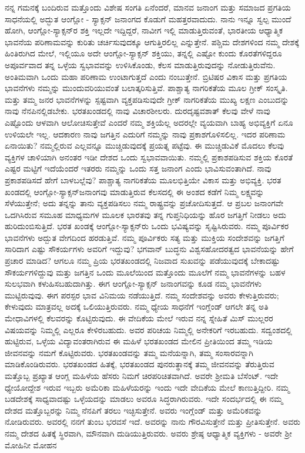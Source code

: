 ನನ್ನ ಗಮನಕ್ಕೆ ಬಂದಿರುವ ಮತ್ತೊಂದು ವಿಶೇಷ ಸಂಗತಿ ಏನೆಂದರೆ, ಮಾನವ ಜನಾಂಗ ಮತ್ತು ಸಮಾಜದ ಪ್ರಗತಿಯ ಸಾಧನೆಯಲ್ಲಿ ಅದ್ಭುತ ಆಂಗ್ಲೋ - ಸ್ಯಾಕ್ಸನ್​ ಜನಾಂಗದ ಕೊಡುಗೆ ಮಹತ್ತರವಾದುದು. ನಾನು ಇನ್ನೂ ಸ್ವಲ್ಪ ಮುಂದೆ ಹೋಗಿ, ಆಂಗ್ಲೋ-ಸ್ಯಾಕ್ಸನ್​ರ ಶಕ್ತಿ ಇಲ್ಲದೇ ಇದ್ದಿದ್ದರೆ, ನಾವೀಗ ಇಲ್ಲಿ ಮಾಡುತ್ತಿರುವಂತೆ, ಭಾರತೀಯ ಆಧ್ಯಾತ್ಮಿಕ ಭಾವನೆಯ ಪರಿಣಾಮವನ್ನು ಕುರಿತು ಚರ್ಚಿಸುವುದಕ್ಕೂ ಆಗುತ್ತಿರಲಿಲ್ಲ ಎನ್ನುತ್ತೇನೆ. ಪಶ್ಚಿಮ ದೇಶಗಳಿಂದ ನಮ್ಮ ದೇಶಕ್ಕೆ ಹಿಂತಿರುಗಿದ ಮೇಲೆ, ಇಲ್ಲಿಯೂ ಅದೇ ಆಂಗ್ಲೋ-ಸ್ಯಾಕ್ಸನ್​ ಶಕ್ತಿಯು, ತನ್ನಲ್ಲಿ ಎಷ್ಟೋ ಕುಂದು ಕೊರತೆಗಳಿದ್ದರೂ ಅಪೂರ್ವವಾದ ತನ್ನ ಒಳ್ಳೆಯ ಸ್ವಭಾವವನ್ನು ಉಳಿಸಿಕೊಂಡು, ಕೆಲಸ ಮಾಡುತ್ತಿರುವುದನ್ನು ನೋಡುತ್ತಿರುವೆನು. ಅಂತಿಮವಾಗಿ ಒಂದು ಮಹಾ ಪರಿಣಾಮ ಉಂಟಾಗುತ್ತದೆ ಎಂದು ನಂಬುತ್ತೇನೆ. ಬ್ರಿಟಿಷರ ವಿಕಾಸ ಮತ್ತು ಪ್ರಗತಿಯ ಭಾವನೆಗಳು ನಮ್ಮನ್ನು ಮುಂದುವರಿಯುವಂತೆ ಬಲಾತ್ಕರಿಸುತ್ತಿವೆ. ಪಾಶ್ಚಾತ್ಯ ನಾಗರಿಕತೆಯ ಮೂಲ ಗ್ರೀಕ್​ ಸಂಸ್ಕೃತಿ. ಮತ್ತು ತಮ್ಮ ಜನರ ಭಾವನೆಗಳನ್ನು ಸ್ಪಷ್ಟವಾಗಿ ವ್ಯಕ್ತಪಡಿಸುವುದೇ ಗ್ರೀಕ್​ ನಾಗರಿಕತೆಯ ಮುಖ್ಯ ಲಕ್ಷಣ ಎಂಬುದನ್ನು ನಾವು ನೆನಪಿನಲ್ಲಿಡಬೇಕು. ಭರತಖಂಡದಲ್ಲಿ ನಾವು ವಿಚಾರಶೀಲರು. ದುರದೃಷ್ಟವಶಾತ್​ ಕೆಲವು ವೇಳೆ ನಾವು ಎಷ್ಟೊಂದು ಆಳವಾಗಿ ಆಲೋಚಿಸುತ್ತೇವೆ ಎಂದರೆ ನಮ್ಮ ಶಕ್ತಿಯೆಲ್ಲ ಅದರಲ್ಲೇ ವ್ಯಯವಾಗಿ ಬಾಹ್ಯ ಅಭಿವ್ಯಕ್ತಿಗೆ ಏನೂ ಉಳಿಯಲೇ ಇಲ್ಲ. ಆದಕಾರಣ ನಾವು ಜಗತ್ತಿನ ಎದುರಿಗೆ ನಮ್ಮನ್ನು ನಾವು ಪ್ರಕಾಶಗೊಳಿಸಲಿಲ್ಲ. ಇದರ ಪರಿಣಾಮ ಏನಾಯಿತು? ನಮ್ಮಲ್ಲಿರುವ ಎಲ್ಲವನ್ನೂ ಮುಚ್ಚಿಡುವುದಕ್ಕೆ ಪ್ರಯತ್ನ ಪಟ್ಟೆವು. ಈ ಮುಚ್ಚಿಡುವಿಕೆ ಮೊದಲು ಕೆಲವು ವ್ಯಕ್ತಿಗಳ ಚಾಳಿಯಾಗಿ ಅನಂತರ ಇಡೀ ದೇಶದ ಒಂದು ಸ್ವಭಾವವಾಯಿತು. ನಮ್ಮಲ್ಲಿ ಪ್ರಕಾಶಪಡಿಸುವ ಶಕ್ತಿಯ ಕೊರತೆ ಎಷ್ಟರ ಮಟ್ಟಿಗೆ ಇದೆಯೆಂದರೆ ಇತರರು ನಮ್ಮನ್ನು ಒಂದು ಸತ್ತ ಜನಾಂಗ ಎಂದು ಭಾವಿಸುವಂತಾಗಿದೆ. ನಾವು ಪ್ರಕಾಶಪಡಿಸದೆ ಹೇಗೆ ಬಾಳಬಲ್ಲೆವು? ಪಾಶ್ಚಾತ್ಯ ನಾಗರಿಕತೆಯ ಮೂಲಭಿತ್ತಿಯೇ ವಿಕಾಸ ಮತ್ತು ಅಭಿವ್ಯಕ್ತಿ. ಭರತ ಖಂಡದಲ್ಲಿ ಆಂಗ್ಲೋ-ಸ್ಯಾಕ್ಸನ್​ ಜನಾಂಗವು ಮಾಡುತ್ತಿರುವ ಕೆಲಸದಲ್ಲಿ ಈ ಅಂಶದ ಕಡೆಗೆ ನಿಮ್ಮ ಲಕ್ಷ್ಯವನ್ನು ಸೆಳೆಯುತ್ತೇನೆ; ಅದು ತನ್ನನ್ನು ತಾನು ವ್ಯಕ್ತಪಡಿಸಲು ನಮ್ಮ ರಾಷ್ಟ್ರವನ್ನು ಪ್ರಚೋದಿಸುತ್ತದೆ. ಆ ಪ್ರಬಲ ಜನಾಂಗವೇ ಒದಗಿಸಿರುವ ಸಮೂಹ ಮಾಧ್ಯಮಗಳ ಮೂಲಕ ಭಾರತವು ತನ್ನ ಗುಪ್ತನಿಧಿಯನ್ನು ಹೊರ ಜಗತ್ತಿಗೆ ನೀಡಲು ಅದು ಹುರಿದುಂಬಿಸುತ್ತಿದೆ. ಭರತ ಖಂಡಕ್ಕೆ ಆಂಗ್ಲೋ-ಸ್ಯಾಕ್ಸನ್​ರು ಒಂದು ಭವಿಷ್ಯವನ್ನು ಸೃಷ್ಟಿಸಿರುವರು. ನಮ್ಮ ಪೂರ್ವಿಕರ ಭಾವನೆಗಳು ಅದ್ಬುತ ವೇಗದಿಂದ ಹರಡುತ್ತಿವೆ. ನಮ್ಮ ಪೂರ್ವಿಕರು ಸತ್ಯ ಮತ್ತು ಮುಕ್ತಿಯ ಸಂದೇಶವನ್ನು ಜಗತ್ತಿಗೆ ಸಾರಿದಾಗ ಎಷ್ಟು ಸೌಕರ್ಯಗಳು ಅವರಿಗೆ ಇದ್ದುವು? ಭಗವಾನ್​ ಬುದ್ಧನು ವಿಶ್ವಸಹೋದರತ್ವದ ಭಾವನೆಯನ್ನು ಹೇಗೆ ಪ್ರಚಾರ ಮಾಡಿದ? ಆಗಲೂ ನಮ್ಮ ಪ್ರಿಯ ಭರತಖಂಡದಲ್ಲಿ ನಿಜವಾದ ಸುಖವನ್ನು ಪಡೆಯುವುದಕ್ಕೆ ಬೇಕಾದಷ್ಟು ಸೌಕರ್ಯಗಳಿದ್ದುವು ಮತ್ತು ಜಗತ್ತಿನ ಒಂದು ಮೂಲೆಯಿಂದ ಮತ್ತೊಂದು ಮೂಲೆಗೆ ನಮ್ಮ ಭಾವನೆಗಳನ್ನು ಬಹಳ ಸುಲಭವಾಗಿ ಕಳುಹಿಸಬಹುದಾಗಿತ್ತು. ಈಗ ಆಂಗ್ಲೋ-ಸ್ಯಾಕ್ಸನ್​ ಜನಾಂಗವನ್ನು ಕೂಡ ನಮ್ಮ ಭಾವನೆಗಳು ಮುಟ್ಟಿರುವುವು. ಈಗ ಪರಸ್ಪರ ಭಾವ ವಿನಿಮಯ ನಡೆಯುತ್ತಿದೆ. ನಮ್ಮ ಸಂದೇಶವನ್ನು ಅವರು ಕೇಳುತ್ತಿರುವರು; ಕೇಳುವುದು ಮಾತ್ರವಲ್ಲ ಅದಕ್ಕೆ ಒಲಿಯುತ್ತಿರುವರು. ನಮ್ಮ ಧ್ಯೇಯ ಸಾಧನೆಗೆ ಇಂಗ್ಲೆಂಡ್​ ಆಗಲೇ ತನ್ನ ಅತಿ ಮೇಧಾವಿಗಳಲ್ಲಿ ಕೆಲವರನ್ನು ಕೊಟ್ಟಿರುವುದು. ಈ ವೇದಿಕೆಯ ಮೇಲೆ ಇರುವ ನನ್ನ ಸ್ನೇಹಿತೆ ಮಿಸ್​ ಮುಲ್ಲರರ ವಿಷಯವನ್ನು ನಿಮ್ಮಲ್ಲಿ ಎಲ್ಲರೂ ಕೇಳಿರಬಹುದು. ಅವರ ಪರಿಚಯ ನಿಮ್ಮಲ್ಲಿ ಅನೇಕರಿಗೆ ಇರಬಹುದು. ಸದ್ವಂಶದಲ್ಲಿ ಹುಟ್ಟಿರುವ, ಒಳ್ಳೆಯ ವಿದ್ಯಾವಂತರಾಗಿರುವ ಈ ಮಹಿಳೆ ಭರತಖಂಡದ ಮೇಲಿನ ಪ್ರೀತಿಯಿಂದ ತಮ್ಮ ಇಡಿಯ ಜೀವನವನ್ನು ನಮಗೆ ಕೊಟ್ಟಿರುವರು. ಭರತಖಂಡವನ್ನು ತಮ್ಮ ಮನೆಯನ್ನಾಗಿ, ತಮ್ಮ ಸಂಸಾರವನ್ನಾಗಿ ಮಾಡಿಕೊಂಡಿರುವರು. ಭರತಖಂಡದ ಹಿತಕ್ಕೆ, ಭರತಖಂಡದ ಪುನರುತ್ಥಾನಕ್ಕೆ ತಮ್ಮ ಜೀವನವನ್ನು ತೆರುತ್ತಿರುವ ಮತ್ತೊಬ್ಬ ಪ್ರಖ್ಯಾತ ಆಂಗ್ಲ ಮಹಿಳೆಯ ಹೆಸರು ನಿಮಗೆ ಚಿರಪರಿಚಿತವಾಗಿದೆ. ಅವರೇ ಶ‍್ರೀಮತಿ ಬೆಸೆಂಟ್​. ಇದೇ ಧ್ಯೇಯೋದ್ದೇಶ ಇರುವ ಇಬ್ಬರು ಅಮೆರಿಕಾ ಮಹಿಳೆಯರನ್ನು ಇಂದು ಇದೇ ವೇದಿಕೆಯ ಮೇಲೆ ಕಾಣುತ್ತಿದ್ದೀರಿ. ನಮ್ಮ ಬಡದೇಶಕ್ಕೆ ಸಾಧ್ಯವಾದಷ್ಟು ಒಳ್ಳೆಯದನ್ನು ಮಾಡಲು ಅವರೂ ಸಿದ್ಧರಾಗಿರುವರು. ಇದೇ ಸಂದರ್ಭದಲ್ಲಿ ಈ ನಮ್ಮ ದೇಶದ ಮತ್ತೊಬ್ಬರನ್ನು ನಿಮ್ಮ ನೆನಪಿಗೆ ತರಲು ಇಚ್ಛಿಸುತ್ತೇನೆ. ಅವರು ಇಂಗ್ಲೆಂಡ್​ ಮತ್ತು ಅಮೆರಿಕವನ್ನು ನೋಡಿರುವರು. ಅವರಲ್ಲಿ ನನಗೆ ತುಂಬ ಭರವಸೆ ಇದೆ. ಅವರನ್ನು ನಾನು ಗೌರವಿಸುತ್ತೇನೆ ಮತ್ತು ಪ್ರೀತಿಸುತ್ತೇನೆ. ಅವರು ನಮ್ಮ ದೇಶದ ಹಿತಕ್ಕೆ ಸ್ಥಿರವಾಗಿ, ಮೌನವಾಗಿ ದುಡಿಯುತ್ತಿರುವರು. ಅವರು ಶ್ರೇಷ್ಠ ಆಧ್ಯಾತ್ಮಿಕ ವ್ಯಕ್ತಿಗಳು - ಅವರೇ ಶ‍್ರೀ ಮೋಹಿನೀ ಮೋಹನ 